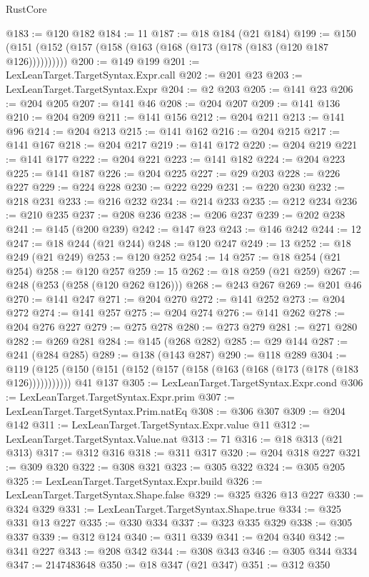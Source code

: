 \begin{lexlean}{RustCore}
\begin{coremodule}
@183 := @120 @182
@184 := 11
@187 := @18 @184 (@21 @184)
@199 := @150 (@151 (@152 (@157 (@158 (@163 (@168 (@173 (@178 (@183 (@120 @187 @126))))))))))
@200 := @149 @199
@201 := LexLeanTarget.TargetSyntax.Expr.call
@202 := @201 @23
@203 := LexLeanTarget.TargetSyntax.Expr
@204 := @2 @203
@205 := @141 @23
@206 := @204 @205
@207 := @141 @46
@208 := @204 @207
@209 := @141 @136
@210 := @204 @209
@211 := @141 @156
@212 := @204 @211
@213 := @141 @96
@214 := @204 @213
@215 := @141 @162
@216 := @204 @215
@217 := @141 @167
@218 := @204 @217
@219 := @141 @172
@220 := @204 @219
@221 := @141 @177
@222 := @204 @221
@223 := @141 @182
@224 := @204 @223
@225 := @141 @187
@226 := @204 @225
@227 := @29 @203
@228 := @226 @227
@229 := @224 @228
@230 := @222 @229
@231 := @220 @230
@232 := @218 @231
@233 := @216 @232
@234 := @214 @233
@235 := @212 @234
@236 := @210 @235
@237 := @208 @236
@238 := @206 @237
@239 := @202 @238
@241 := @145 (@200 @239)
@242 := @147 @23
@243 := @146 @242
@244 := 12
@247 := @18 @244 (@21 @244)
@248 := @120 @247
@249 := 13
@252 := @18 @249 (@21 @249)
@253 := @120 @252
@254 := 14
@257 := @18 @254 (@21 @254)
@258 := @120 @257
@259 := 15
@262 := @18 @259 (@21 @259)
@267 := @248 (@253 (@258 (@120 @262 @126)))
@268 := @243 @267
@269 := @201 @46
@270 := @141 @247
@271 := @204 @270
@272 := @141 @252
@273 := @204 @272
@274 := @141 @257
@275 := @204 @274
@276 := @141 @262
@278 := @204 @276 @227
@279 := @275 @278
@280 := @273 @279
@281 := @271 @280
@282 := @269 @281
@284 := @145 (@268 @282)
@285 := @29 @144
@287 := @241 (@284 @285)
@289 := @138 (@143 @287)
@290 := @118 @289
@304 := @119
    (@125 (@150 (@151 (@152 (@157 (@158 (@163 (@168 (@173 (@178 (@183 @126)))))))))))
    @41
    @137
@305 := LexLeanTarget.TargetSyntax.Expr.cond
@306 := LexLeanTarget.TargetSyntax.Expr.prim
@307 := LexLeanTarget.TargetSyntax.Prim.natEq
@308 := @306 @307
@309 := @204 @142
@311 := LexLeanTarget.TargetSyntax.Expr.value @11
@312 := LexLeanTarget.TargetSyntax.Value.nat
@313 := 71
@316 := @18 @313 (@21 @313)
@317 := @312 @316
@318 := @311 @317
@320 := @204 @318 @227
@321 := @309 @320
@322 := @308 @321
@323 := @305 @322
@324 := @305 @205
@325 := LexLeanTarget.TargetSyntax.Expr.build
@326 := LexLeanTarget.TargetSyntax.Shape.false
@329 := @325 @326 @13 @227
@330 := @324 @329
@331 := LexLeanTarget.TargetSyntax.Shape.true
@334 := @325 @331 @13 @227
@335 := @330 @334
@337 := @323 @335 @329
@338 := @305 @337
@339 := @312 @124
@340 := @311 @339
@341 := @204 @340
@342 := @341 @227
@343 := @208 @342
@344 := @308 @343
@346 := @305 @344 @334
@347 := 2147483648
@350 := @18 @347 (@21 @347)
@351 := @312 @350

\end{coremodule}
\end{lexlean}
